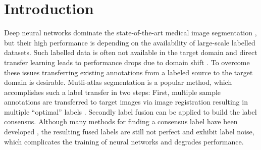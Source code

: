 \section{Introduction}

Deep neural networks dominate the state-of-the-art medical image segmentation \cite{liu2021review,ronneberger2015u,isensee2021nnu}, but their high performance is depending on the availability of large-scale labelled datasets.
Such labelled data is often not available in the target domain and direct transfer learning leads to performance drops due to domain shift \cite{yan2019domain}.
To overcome these issues transferring existing annotations from a labeled source to the target domain is desirable.
Mutli-atlas segmentation is a popular method, which accomplishes such a label transfer in two steps:
First, multiple sample annotations are transferred to target images via image registration \cite{marstal2016simpleelastix,heinrich2012globally,siebert2021fast} resulting in multiple ``optimal'' labels \cite{artaechevarria2009combination}.
Secondly label fusion can be applied to build the label consensus.
Although many methods for finding a consensus label have been developed \cite{artaechevarria2009combination,heckemann2006automatic,rohlfing2004performance,warfield2004simultaneous,wang2013multi}, the resulting fused labels are still not perfect and exhibit label noise, which complicates the training of neural networks and degrades performance.

